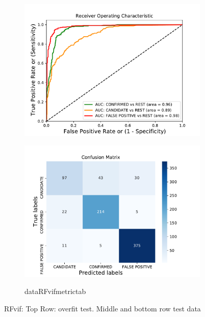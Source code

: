 \begin{figure}[H]
\begin{mdframed}[linecolor=green]
\begin{subfigure}{.49\textwidth}
                \includegraphics[width = 1\textwidth]{data/RF_vif_roc.pdf}
                \end{subfigure}
                \begin{subfigure}{.49\textwidth}
                \includegraphics[width = 1\textwidth]{data/RF_vif_cm.pdf}
                \end{subfigure}
                \begin{subfigure}{1\textwidth}
                \csname dataRFvifmetrictab\endcsname
                \end{subfigure}
                \caption{RFvif: Top Row: overfit test. Middle and bottom row test data}
                \label{fig:data/RF_vif_roc}
                \end{mdframed}
                \end{figure}